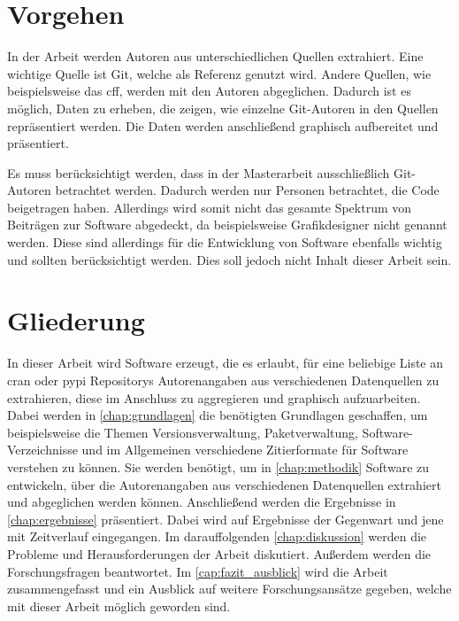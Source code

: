 \section{Vorgehen}
\label{sec:vorgehen}
In der Arbeit werden Autoren aus unterschiedlichen Quellen extrahiert.
Eine wichtige Quelle ist Git, welche als Referenz genutzt wird.
Andere Quellen, wie beispielsweise das \gls{cff}, werden mit den Autoren abgeglichen.
Dadurch ist es möglich, Daten zu erheben, die zeigen, wie einzelne Git-Autoren in den Quellen repräsentiert werden.
Die Daten werden anschließend graphisch aufbereitet und präsentiert.

Es muss berücksichtigt werden, dass in der Masterarbeit ausschließlich Git-Autoren betrachtet werden.
Dadurch werden nur Personen betrachtet, die Code beigetragen haben.
Allerdings wird somit nicht das gesamte Spektrum von Beiträgen zur Software abgedeckt, da beispielsweise Grafikdesigner nicht genannt werden.
Diese sind allerdings für die Entwicklung von Software ebenfalls wichtig und sollten berücksichtigt werden.
Dies soll jedoch nicht Inhalt dieser Arbeit sein.

\section{Gliederung}
\label{sec:gliederung}
In dieser Arbeit wird Software erzeugt, die es erlaubt, für eine beliebige Liste an \gls{cran} oder \gls{pypi} Repositorys Autorenangaben aus verschiedenen Datenquellen zu extrahieren, diese im Anschluss zu aggregieren und graphisch aufzuarbeiten.
Dabei werden in \autoref{chap:grundlagen} die benötigten Grundlagen geschaffen, um beispielsweise die Themen Versionsverwaltung, Paketverwaltung, Software-Verzeichnisse und im Allgemeinen verschiedene Zitierformate für Software verstehen zu können.
Sie werden benötigt, um in \autoref{chap:methodik} Software zu entwickeln, über die Autorenangaben aus verschiedenen Datenquellen extrahiert und abgeglichen werden können.
Anschließend werden die Ergebnisse in \autoref{chap:ergebnisse} präsentiert.
Dabei wird auf Ergebnisse der Gegenwart und jene mit Zeitverlauf eingegangen.
Im darauffolgenden \autoref{chap:diskussion} werden die Probleme und Herausforderungen der Arbeit diskutiert.
Außerdem werden die Forschungsfragen beantwortet.
Im \autoref{cap:fazit_ausblick} wird die Arbeit zusammengefasst und ein Ausblick auf weitere Forschungsansätze gegeben, welche mit dieser Arbeit möglich geworden sind.
